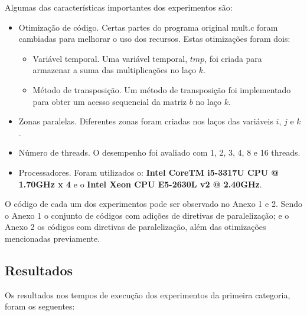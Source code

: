 \documentclass[a4paper,12pt,fleqn]{article}
\begin{document}
Algumas das características importantes dos experimentos são: 
\begin{itemize} 
    \item Otimização de código. Certas partes do programa original mult.c foram cambiadas para melhorar o uso dos recursos. Estas otimizações foram dois: 
    \begin{itemize}
        \item Variável temporal. Uma variável temporal, $tmp$, foi criada para armazenar a suma das multiplicações no laço $k$.
        \item Método de transposição. Um método de transposição foi implementado para obter um acesso sequencial da matriz $b$ no laço $k$.
    \end{itemize}
    \item Zonas paralelas. Diferentes zonas foram criadas nos laços das variáveis $i$, $j$ e $k$.  
    \item Número de threads. O desempenho foi avaliado com 1, 2, 3, 4, 8 e 16 threads.   
    \item Processadores. Foram utilizados o: \textbf{Intel CoreTM i5-3317U CPU @ 1.70GHz x 4} e o \textbf{Intel Xeon CPU E5-2630L v2 @ 2.40GHz}.
\end{itemize} 

O código de cada um dos experimentos pode ser observado no Anexo 1 e 2. Sendo o Anexo 1 o conjunto de códigos com adições de diretivas de paralelização; e o Anexo 2 os códigos com diretivas de paralelização, além das otimizações mencionadas previamente.  

\subsection{Resultados} 

Os resultados nos tempos de execução dos experimentos da primeira categoria, foram os seguentes: 
\end{document}
